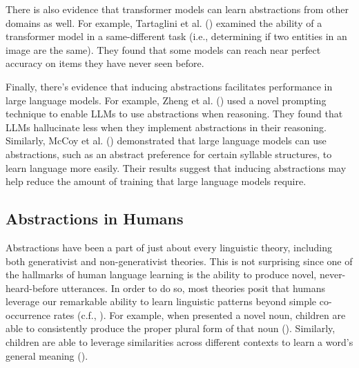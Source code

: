 \documentclass[
  12pt,
  letterpaper,
]{scrreprt}
\begin{document}
There is also evidence that transformer models can learn abstractions
from other domains as well. For example, Tartaglini et al.
() examined the
ability of a transformer model in a same-different task (i.e.,
determining if two entities in an image are the same). They found that
some models can reach near perfect accuracy on items they have never
seen before.

Finally, there's evidence that inducing abstractions facilitates
performance in large language models. For example, Zheng et al.
() used a novel prompting
technique to enable LLMs to use abstractions when reasoning. They found
that LLMs hallucinate less when they implement abstractions in their
reasoning. Similarly, McCoy et al.
()
demonstrated that large language models can use abstractions, such as an
abstract preference for certain syllable structures, to learn language
more easily. Their results suggest that inducing abstractions may help
reduce the amount of training that large language models require.

\subsection{Abstractions in Humans}\label{abstractions-in-humans}

Abstractions have been a part of just about every linguistic theory,
including both generativist and non-generativist theories. This is not
surprising since one of the hallmarks of human language learning is the
ability to produce novel, never-heard-before utterances. In order to do
so, most theories posit that humans leverage our remarkable ability to
learn linguistic patterns beyond simple co-occurrence rates (c.f.,
).
For example, when presented a novel noun, children are able to
consistently produce the proper plural form of that noun
(). Similarly,
children are able to leverage similarities across different contexts to
learn a word's general meaning
().
\end{document}
